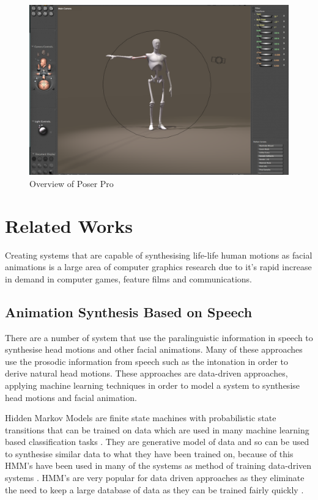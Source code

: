 \documentclass[bsc,frontabs,twoside,singlespacing,parskip]{infthesis}
\begin{document}
\begin{figure}
	\centering
		\includegraphics[width=1.0\textwidth]{poser.png}
		\caption{Overview of Poser Pro}
\end{figure}

\section{Related Works}

Creating systems that are capable of synthesising life-life human motions as facial animations is a large area of computer graphics research due to it's rapid increase in demand in computer games, feature films and communications.

\subsection{Animation Synthesis Based on Speech}

There are a number of system that use the paralinguistic information in speech to synthesise head motions and other facial animations. Many of these approaches use the prosodic information from speech such as the intonation in order to derive natural head motions. These approaches are data-driven approaches, applying machine learning techniques in order to model a system to synthesise head motions and facial animation.

Hidden Markov Models are finite state machines with probabilistic state transitions that can be trained on data which are used in many machine learning based classification tasks \cite{hmms}. They are generative model of data and so can be used to synthesise similar data to what they have been trained on, because of this HMM's have been used in many of the systems as method of training data-driven systems \cite{puppetry}.  HMM's are very popular for data driven approaches as they eliminate the need to keep a large database of data as they can be trained fairly quickly \cite{expressive_speech_animation}. 
\end{document}

